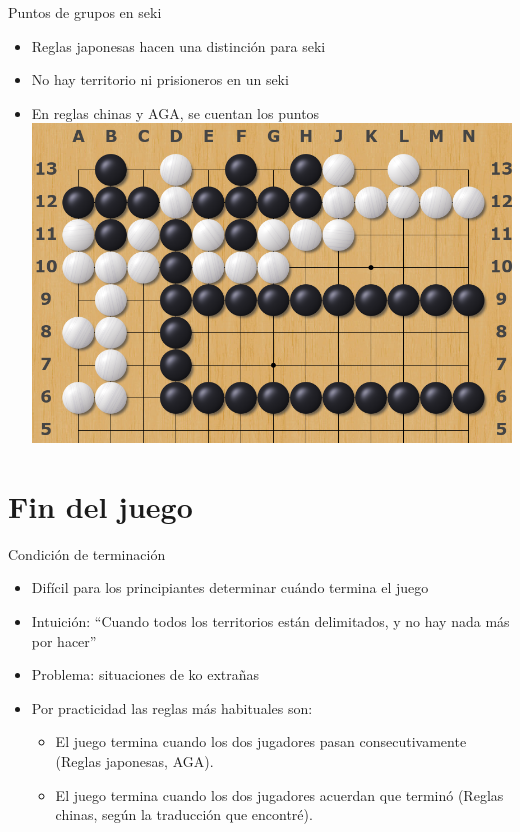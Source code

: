 \documentclass{beamer}
\begin{document}
\begin{frame}{Puntos de grupos en seki}

    \begin{itemize}
        \item Reglas japonesas hacen una distinción para seki
        \item No hay territorio ni prisioneros en un seki
        \item En reglas chinas y AGA, se cuentan los puntos
        \includegraphics[scale=0.25]{sekisinpuntos.png}
    \end{itemize}
  
\end{frame}


\section{Fin del juego}

\begin{frame}{Condición de terminación}

    \begin{itemize}
        \item Difícil para los principiantes determinar cuándo termina el juego
        \item Intuición: ``Cuando todos los territorios están delimitados, y no hay nada más por hacer''
        \item Problema: situaciones de ko extrañas
        \item Por practicidad las reglas más habituales son:
          \begin{itemize}
              \item El juego termina cuando los dos jugadores pasan consecutivamente (Reglas japonesas, AGA). 
              \item El juego termina cuando los dos jugadores acuerdan que terminó (Reglas chinas, según la traducción que encontré). 
          \end{itemize}
    \end{itemize}
  
\end{frame}
\end{document}
